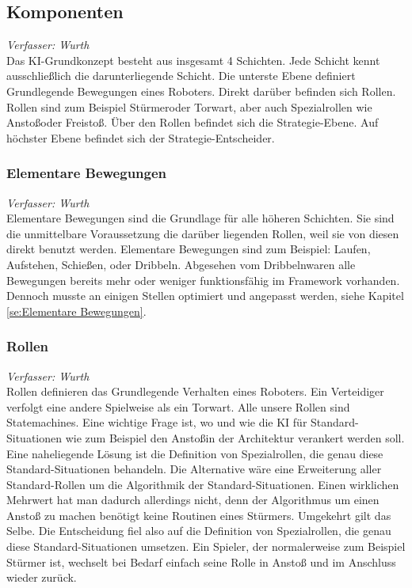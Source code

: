 \documentclass[fontsize=12pt,a4paper,final]{scrartcl}[2003/01/01]
\begin{document}
\subsection{Komponenten}
\textit{Verfasser: Wurth}\\

Das KI-Grundkonzept besteht aus insgesamt 4 Schichten. Jede Schicht kennt ausschließlich die darunterliegende Schicht. Die unterste Ebene definiert Grundlegende Bewegungen eines Roboters. Direkt darüber befinden sich Rollen. Rollen sind zum Beispiel \glqq Stürmer\grqq oder \glqq Torwart\grqq, aber auch Spezialrollen wie \glqq Anstoß\grqq oder \glqq Freistoß\grqq. Über den Rollen befindet sich die Strategie-Ebene. Auf höchster Ebene befindet sich der Strategie-Entscheider.

\subsubsection{Elementare Bewegungen}
\textit{Verfasser: Wurth}\\

Elementare Bewegungen sind die Grundlage für alle höheren Schichten. Sie sind die unmittelbare Voraussetzung die darüber liegenden Rollen, weil sie von diesen direkt benutzt werden. Elementare Bewegungen sind zum Beispiel: \glqq Laufen\grqq, \glqq Aufstehen\grqq, \glqq Schießen\grqq, oder \glqq Dribbeln\grqq. Abgesehen vom \glqq Dribbeln\grqq waren alle Bewegungen bereits mehr oder weniger funktionsfähig im Framework vorhanden. Dennoch musste an einigen Stellen optimiert und angepasst werden, siehe Kapitel \ref{se:Elementare Bewegungen}.

\subsubsection{Rollen}\label{Rollen Konzept}
\textit{Verfasser: Wurth}\\

Rollen definieren das Grundlegende Verhalten eines Roboters. Ein Verteidiger verfolgt eine andere Spielweise als ein Torwart. Alle unsere Rollen sind Statemachines. Eine wichtige Frage ist, wo und wie die KI für Standard-Situationen wie zum Beispiel den \glqq Anstoß\grqq in der Architektur verankert werden soll. Eine naheliegende Lösung ist die Definition von Spezialrollen, die genau diese Standard-Situationen behandeln. Die Alternative wäre eine Erweiterung aller Standard-Rollen um die Algorithmik der Standard-Situationen. Einen wirklichen Mehrwert hat man dadurch allerdings nicht, denn der Algorithmus um einen Anstoß zu machen benötigt keine Routinen eines Stürmers. Umgekehrt gilt das Selbe. Die Entscheidung fiel also auf die Definition von Spezialrollen, die genau diese Standard-Situationen umsetzen. Ein Spieler, der normalerweise zum Beispiel Stürmer ist, wechselt bei Bedarf einfach seine Rolle in \glqq Anstoß\grqq{} und im Anschluss wieder zurück.
\end{document}
